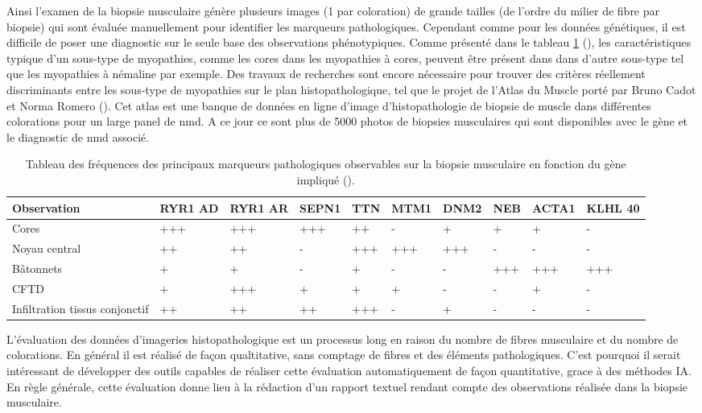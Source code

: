 Ainsi l'examen de la biopsie musculaire génère plusieurs images (1 par coloration) de grande tailles (de l'ordre du milier de fibre par biopsie) qui sont évaluée manuellement pour identifier les marqueurs pathologiques. Cependant comme pour les données génétiques, il est difficile de poser une diagnostic sur le seule base des observations phénotypiques. Comme présenté dans le tableau \ref{tab:histopath} (\cite{jungbluth_congenital_2018}), les caractéristiques typique d'un sous-type de myopathies, comme les cores dans les myopathies à cores, peuvent être présent dans dans d'autre sous-type tel que les myopathies à némaline par exemple. Des travaux de recherches sont encore nécessaire pour trouver des critères réellement discriminants entre les sous-type de myopathies sur le plan histopathologique, tel que le projet de l'Atlas du Muscle porté par Bruno Cadot et Norma Romero (\cite{cadot_atlas_2022}). Cet atlas est une banque de données en ligne d'image d'histopathologie de biopsie de muscle dans différentes colorations pour un large panel de \gls{nmd}. A ce jour ce sont plus de 5000 photos de biopsies musculaires qui sont disponibles avec le gène et le diagnostic de \gls{nmd} associé. 

\begin{table}[!ht]
\begin{tabularx}{\textwidth}{|p{1.8cm}|X|X|X|X|X|X|X|X|X|}
 \hline
\textbf{Observation} & \textbf{RYR1 AD} & \textbf{RYR1 AR} & \textbf{SEPN1} & \textbf{TTN} & \textbf{MTM1} & \textbf{DNM2} & \textbf{NEB} & \textbf{ACTA1} & \textbf{KLHL 40} \\
\hline
Cores & +++ & +++ & +++ & ++ & - & + & + & + & - \\
\hline
Noyau central & ++ & ++ & - & +++ & +++ & +++ & - & - & - \\
\hline
Bâtonnets  & + & + & - & + & - & - & +++ & +++ & +++ \\
\hline
CFTD & + & +++ & + & + & + & - & - & + & - \\
\hline
Infiltration tissus conjonctif & ++ & ++ & ++ & +++ & - & + & - & - & - \\
\hline
\end{tabularx}
\caption{Tableau des fréquences des principaux marqueurs pathologiques observables sur la biopsie musculaire en fonction du gène impliqué (\cite{jungbluth_congenital_2018}). }
\label{tab:histopath}
\end{table}
L'évaluation des données d'imageries histopathologique est un processus long en raison du nombre de fibres musculaire et du nombre de colorations. En général il est réalisé de façon qualtitative, sans comptage de fibres et des éléments pathologiques. C'est pourquoi il serait intéressant de développer des outils capables de réaliser cette évaluation automatiquement de façon quantitative, grace à des méthodes IA. En règle générale, cette évaluation donne lieu à la rédaction d'un rapport textuel rendant compte des observations réalisée dans la biopsie musculaire.


